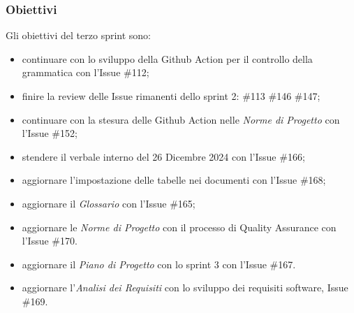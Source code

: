 \subsubsection{Obiettivi}
Gli obiettivi del terzo sprint sono:
\begin{itemize}
    \item continuare con lo sviluppo della Github Action per il controllo della grammatica con l'Issue \#112;
    \item finire la review delle Issue rimanenti dello sprint 2: \#113 \#146 \#147;
    \item continuare con la stesura delle Github Action nelle \textit{Norme di Progetto} con l'Issue \#152;
    \item stendere il verbale interno del 26 Dicembre 2024 con l'Issue \#166;
    \item aggiornare l'impostazione delle tabelle nei documenti con l'Issue \#168;
    \item aggiornare il \textit{Glossario} con l'Issue \#165;
    \item aggiornare le \textit{Norme di Progetto} con il processo di Quality Assurance con l'Issue \#170.
    \item aggiornare il \textit{Piano di Progetto} con lo sprint 3 con l'Issue \#167.
    \item aggiornare l'\textit{Analisi dei Requisiti} con lo sviluppo dei requisiti software, Issue \#169.
\end{itemize}